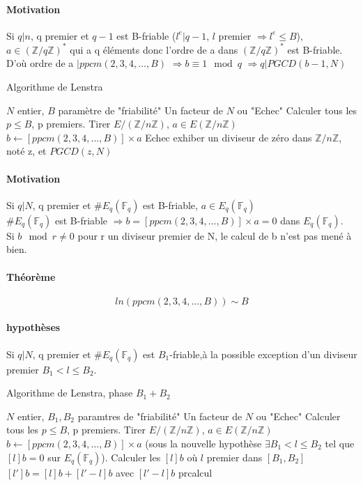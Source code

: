 \documentclass[12pt,a4paper]{report}
\begin{document}
\paragraph{Motivation\\}
Si $q|n$, q premier et $q-1$ est B-friable ($l^e | q-1$, $l$ premier $\Rightarrow l^e \leqslant B$), $ a \in (\mathbb{Z}/q\mathbb{Z})^*$ qui a q éléments donc l'ordre de a dans $(\mathbb{Z}/q\mathbb{Z})^*$ est B-friable.
D'où ordre de a $| ppcm(2,3,4,\ldots,B)$
$\Longrightarrow b \equiv 1 \mod q$ 
$ \Longrightarrow q | PGCD(b-1,N)$
\begin{algorithm}[ht]
\caption{Algorithme de Lenstra}
\begin{algorithmic}[1]
\REQUIRE $N$ entier, $B$ paramètre de "friabilité"
\ENSURE Un facteur de $N$ ou "Echec"
\STATE Calculer tous les $p \leqslant B$, p premiers.
\STATE Tirer $E/(\mathbb{Z}/n\mathbb{Z})$, $a \in E(\mathbb{Z}/n\mathbb{Z})$
\STATE $b \leftarrow [ppcm(2,3,4,\ldots,B)]\times a$
\RETURN Echec 
\ELSE 
\STATE exhiber un diviseur de zéro dans $\mathbb{Z}/n\mathbb{Z}$, noté z, et \RETURN $PGCD(z,N)$
\ENDIF
\end{algorithmic}
\end{algorithm}
\paragraph{Motivation\\}
Si $q|N$, q premier et $\#E_q(\mathbb{F}_q)$ est B-friable, $ a \in E_q(\mathbb{F}_q)$ \\
$\#E_q(\mathbb{F}_q)$ est B-friable $\Rightarrow b = [ppcm(2,3,4,\ldots,B)]\times a = 0 $ dans $E_q(\mathbb{F}_q)$.\\
Si $b \mod r \neq 0$ pour r un diviseur premier de N, le calcul de b n'est pas mené  à bien.
\paragraph{Théorème\\}
$$ ln(ppcm(2,3,4,\ldots,B)) \sim B$$
\paragraph{hypothèses\\}
Si $q|N$, q premier et $\#E_q(\mathbb{F}_q)$ est $ B_1$-friable,à la possible exception d'un diviseur premier $B_1 < l \leqslant B_2$.
\begin{algorithm}[ht]
\caption{Algorithme de Lenstra, phase $B_1+B_2$}
\begin{algorithmic}[1]
\REQUIRE $N$ entier, $B_1,B_2$ paramtres de "friabilité"
\ENSURE Un facteur de $N$ ou "Echec"
\STATE Calculer tous les $p \leqslant B$, p premiers.
\STATE Tirer $E/(\mathbb{Z}/n\mathbb{Z})$, $a \in E(\mathbb{Z}/n\mathbb{Z})$
\STATE $b \leftarrow [ppcm(2,3,4,\ldots,B)]\times a$ (sous la nouvelle hypothèse $\exists B_1 < l \leqslant B_2$ tel que $[l]b=0$ sur $E_q(\mathbb{F}_q)$).
\STATE Calculer les $[l]b$ où $l$ premier dans $[B_1,B_2]$\\
$ [l']b=[l]b+[l'-l]b$ avec $[l'-l]b$ prcalcul

\end{algorithmic}
\end{algorithm}
\end{document}
